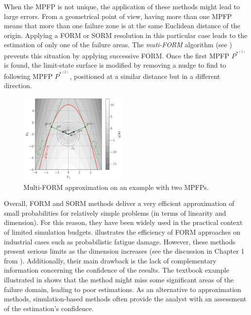 When the MPFP is not unique, the application of these methods might lead to large errors. 
From a geometrical point of view, having more than one MPFP means that more than one failure zone is at the same Euclidean distance of the origin. 
Applying a FORM or SORM resolution in this particular case leads to the estimation of only one of the failure areas. 
The \textit{muti-FORM} algorithm (see \citet{derkiureghian_1998}) prevents this situation by applying successive FORM. 
Once the first MPFP $P^{*^{(1)}}$ is found, the limit-state surface is modified by removing a nudge to find to following MPFP $P^{*^{(2)}}$, positioned at a similar distance but in a different direction. 

\begin{figure}[ht]
    \centering
    \includegraphics[width=0.48\textwidth]{../numerical_experiments/chapter1/figures/reliability_multiform.png}
    \caption{Multi-FORM approximation on an example with two MPFPs.}
    \label{fig:multi_FORM}
\end{figure}


Overall, FORM and SORM methods deliver a very efficient approximation of small probabilities for relatively simple problems (in terms of linearity and dimension). 
For this reason, they have been widely used in the practical context of limited simulation budgets. 
\citet{straub_2014_fatigue_form} illustrates the efficiency of FORM approaches on industrial cases such as probabilistic fatigue damage. 
However, these methods present serious limits as the dimension increases (see the discussion in Chapter 1 from \citealp{chabridon_2018_thesis}). 
Additionally, their main drawback is the lack of complementary information concerning the confidence of the results. 
The textbook example illustrated in  shows that the method might miss some significant areas of the failure domain, leading to poor estimations. 
As an alternative to approximation methods, simulation-based methods often provide the analyst with an assessment of the estimation's confidence. 


